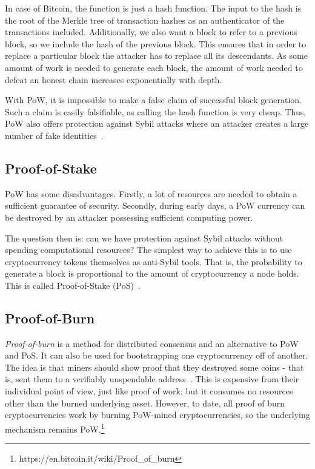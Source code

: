 \documentclass[]{report}   %
\begin{document}
In case of Bitcoin, the function is just a hash function. The input to the hash is the root of the Merkle tree of transaction hashes as an authenticator of the transactions included. Additionally, we also want a block to refer to a previous block, so we include the hash of the previous block. This ensures that in order to replace a particular block the attacker has to replace all its descendants. As some amount of work is needed to generate each block, the amount of work needed to defeat an honest chain increases exponentially with depth.

With PoW, it is impossible to make a false claim of successful block generation. Such a claim is easily falsifiable, as calling the hash function is very cheap. Thus, PoW also offers protection against Sybil attacks where an attacker creates a large number of fake identities~\cite{douceur2002sybil}.

\subsection{Proof-of-Stake}

PoW has some disadvantages. Firstly, a lot of resources are needed to obtain a sufficient guarantee of security. Secondly, during early days, a PoW currency can be destroyed by an attacker possessing sufficient computing power. 

The question then is: can we have protection against Sybil attacks without spending computational resources? 
The simplest way to achieve this is to use cryptocurrency tokens themselves as anti-Sybil tools. 
That is, the probability to generate a block is proportional to the amount of cryptocurrency a node holds. This is called Proof-of-Stake (PoS)~\cite{kiayias2016provably,king2012ppcoin}.

\subsection{Proof-of-Burn}

{\em Proof-of-burn} is a method for distributed consensus and an alternative to PoW and PoS. It can also be used for bootstrapping one cryptocurrency off of another.
The idea is that miners should show proof that they destroyed some coins - that is, sent them to a verifiably unspendable address~\cite{stewart2012proof}. This is expensive from their individual point of view, just like proof of work; but it consumes no resources other than the burned underlying asset. However, to date, all proof of burn cryptocurrencies work by burning PoW-mined cryptocurrencies, so the underlying mechanism remains PoW.\footnote{https://en.bitcoin.it/wiki/Proof\_of\_burn}
\end{document}
